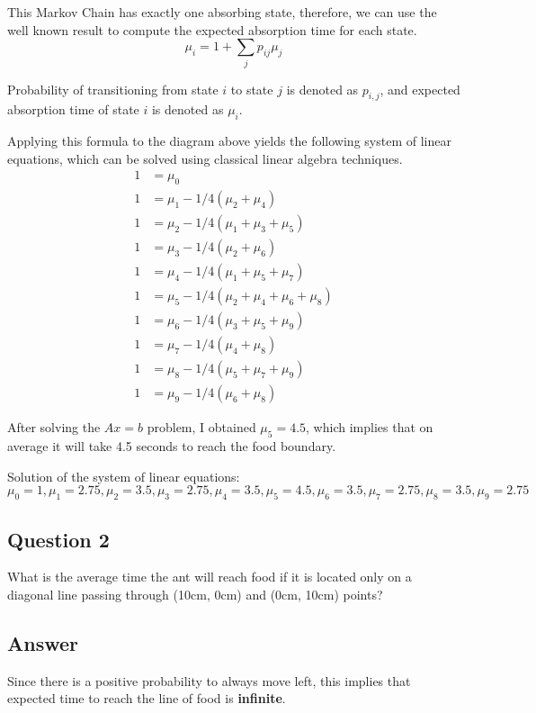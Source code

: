 \documentclass{article}
\begin{document}
This Markov Chain has exactly one absorbing state, therefore, we can use the well known result to compute the expected absorption time for each state. $$\mu_i=1 + \sum_j p_{ij}\mu_j$$

Probability of transitioning from state $i$ to state $j$ is denoted as $p_{i,j}$, and expected absorption time of state $i$ is denoted as $\mu_i$. 

Applying this formula to the diagram above yields the following system of linear equations, which can be solved using classical linear algebra techniques.
\begin{align}
    1 &= \mu_0\\
    1 &= \mu_1  - 1/4(\mu_2 + \mu_4)\\
    1 &= \mu_2 - 1/4(\mu_1 + \mu_3 + \mu_5)\\
    1 &= \mu_3 - 1/4(\mu_2 +\mu_6) \\
    1 &= \mu_4 - 1/4(\mu_1+\mu_5+\mu_7)\\
    1 &= \mu_5 - 1/4(\mu_2+\mu_4+\mu_6 +\mu_8)\\
    1 &= \mu_6 - 1/4(\mu_3 +\mu_5+\mu_{9}) \\
    1 &= \mu_7 - 1/4(\mu_4 + \mu_8) \\
    1 &= \mu_8 - 1/4(\mu_5 + \mu_7 + \mu_{9})\\
    1 &= \mu_{9} - 1/4(\mu_6 + \mu_8)
\end{align}

After solving the $Ax=b$ problem, I obtained $\mu_5=4.5$, which implies that on average it will take 4.5 seconds to reach the food boundary. 


Solution of the system of linear equations:
$\mu_0 = 1, \mu_1 = 2.75, \mu_2 = 3.5, \mu_3= 2.75, \mu_4 = 3.5, \mu_5 = 4.5, \mu_6 = 3.5, \mu_7 = 2.75, \mu_8 =3.5, \mu_9 = 2.75$


\subsection{Question 2}
What is the average time the ant will reach food if it is located only on a diagonal line passing through (10cm, 0cm) and (0cm, 10cm) points?

\subsection{Answer}
Since there is a positive probability to always move left, this implies that expected time to reach the line of food is \textbf{infinite}.
\end{document}
